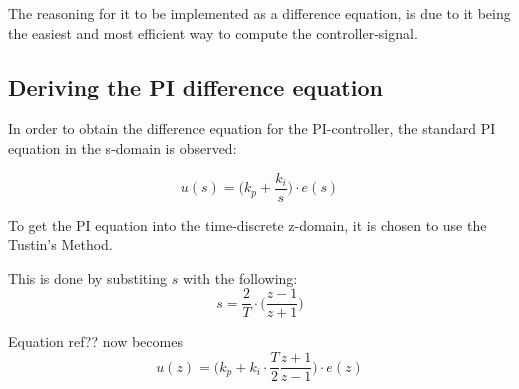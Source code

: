 \documentclass[../../../main]{subfiles}
\begin{document}
The reasoning for it to be implemented as a difference equation, is due to it being the easiest and most efficient way to compute the controller-signal.

\subsection{Deriving the PI difference equation}

In order to obtain the difference equation for the PI-controller, the standard PI equation in the s-domain is observed:

\begin{equation}
  u(s) = \Bigg(k_p + \frac{k_i}{s} \Bigg) \cdot e(s)
\end{equation}


To get the PI equation into the time-discrete z-domain, it is chosen to use the Tustin's Method.

This is done by substiting $s$ with the following:
$$
s = \frac{2}{T}\cdot \Bigg( \frac{z-1}{z+1}\Bigg)
$$

Equation ref??  now becomes
$$
  u(z) = \Bigg(k_p + k_i\cdot \frac{T}{2} \frac{z+1}{z-1} \Bigg) \cdot e(z)
$$
\end{document}
